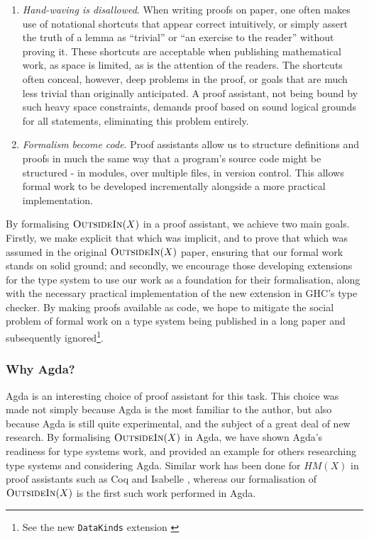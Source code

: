 \documentclass[a4paper]{jfp}
\newcommand{\outsidein}{\textsc{OutsideIn}(X)}
\begin{document}
\begin{enumerate}
	\item \emph{Hand-waving is disallowed}. When writing proofs on paper, one often makes use of notational shortcuts that appear correct intuitively, or simply assert the truth of a lemma as ``trivial'' or ``an exercise to the reader'' without proving it. These shortcuts are acceptable when publishing mathematical work, as space is limited, as is the attention of the readers. The shortcuts often conceal, however, deep problems in the proof, or goals that are much less trivial than originally anticipated. A proof assistant, not being bound by such heavy space constraints, demands proof based on sound logical grounds for all statements, eliminating this problem entirely. 
	\item \emph{Formalism become code}. Proof assistants allow us to structure definitions and proofs in much the same way that a program's source code might be structured - in modules, over multiple files, in version control. This allows formal work to be developed incrementally alongside a more practical implementation.	
\end{enumerate}	

By formalising $\outsidein$ in a proof assistant, we achieve two main goals. Firstly, we make explicit that which was implicit, and to prove that which was assumed in the original $\outsidein$ paper, ensuring that our formal work stands on solid ground; and secondly, we encourage those developing extensions for the type system to use our work as a foundation for their formalisation, along with the necessary practical implementation of the new extension in GHC's type checker. By making proofs available as code, we hope to mitigate the social problem of formal work on a type system being published in a long paper and subsequently ignored\footnote{See the new {\tt DataKinds} extension \cite{Yorgey:2012:GHP:2103786.2103795} }. 

\subsubsection{Why Agda?}

Agda is an interesting choice of proof assistant for this task. This choice was made not simply because Agda is the most familiar to the author, but also because Agda is still quite experimental, and the subject of a great deal of new research. By formalising $\outsidein$ in Agda, we have shown Agda's readiness for type systems work, and provided an example for others researching type systems and considering Agda. Similar work has been done for $HM(X)$ in proof assistants such as Coq \cite{Dubois00provingml} and Isabelle \cite{Naraschewski:1999:TIV:594135.594270}, whereas our formalisation of $\outsidein$ is the first such work performed in Agda. 
\end{document}
